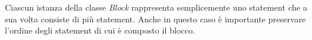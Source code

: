 
Ciascun istanza della classe \textit{Block} rappresenta semplicemente uno statement che a sua volta consiste di più statement. Anche in questo caso è importante preservare l'ordine degli statement di cui è composto il blocco.